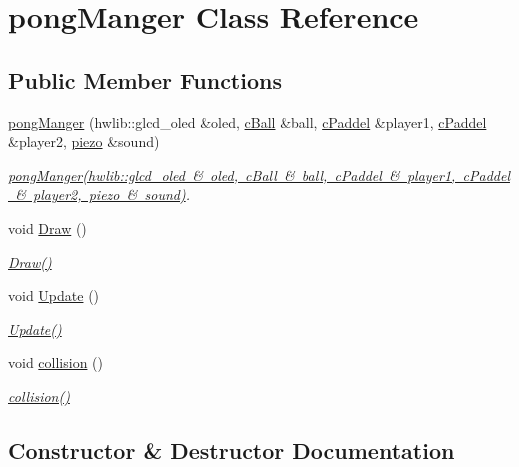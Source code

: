 \hypertarget{classpong_manger}{}\section{pong\+Manger Class Reference}
\label{classpong_manger}
\subsection*{Public Member Functions}
\begin{DoxyCompactItemize}
\item 
\mbox{\hyperlink{classpong_manger_a757b4d3c1ace0490604e4f93da6b5a04}{pong\+Manger}} (hwlib\+::glcd\+\_\+oled \&oled, \mbox{\hyperlink{classc_ball}{c\+Ball}} \&ball, \mbox{\hyperlink{classc_paddel}{c\+Paddel}} \&player1, \mbox{\hyperlink{classc_paddel}{c\+Paddel}} \&player2, \mbox{\hyperlink{classpiezo}{piezo}} \&sound)
\begin{DoxyCompactList}\small\item\em \mbox{\hyperlink{classpong_manger_a757b4d3c1ace0490604e4f93da6b5a04}{pong\+Manger(hwlib\+::glcd\+\_\+oled  \& oled, c\+Ball \& ball, c\+Paddel \& player1, c\+Paddel \& player2, piezo \& sound)}}. \end{DoxyCompactList}\item 
void \mbox{\hyperlink{classpong_manger_a2c2c6e7f024261d5b3e3f4b85abb060a}{Draw}} ()
\begin{DoxyCompactList}\small\item\em \mbox{\hyperlink{classpong_manger_a2c2c6e7f024261d5b3e3f4b85abb060a}{Draw()}} \end{DoxyCompactList}\item 
void \mbox{\hyperlink{classpong_manger_a878b50d69f98eb0de013269fbf9b0ead}{Update}} ()
\begin{DoxyCompactList}\small\item\em \mbox{\hyperlink{classpong_manger_a878b50d69f98eb0de013269fbf9b0ead}{Update()}} \end{DoxyCompactList}\item 
void \mbox{\hyperlink{classpong_manger_a177da6a9f5120dc153b8f33d8e6bebc3}{collision}} ()
\begin{DoxyCompactList}\small\item\em \mbox{\hyperlink{classpong_manger_a177da6a9f5120dc153b8f33d8e6bebc3}{collision()}} \end{DoxyCompactList}\end{DoxyCompactItemize}


\subsection{Constructor \& Destructor Documentation}
\mbox{\label{classpong_manger_a757b4d3c1ace0490604e4f93da6b5a04}} 
